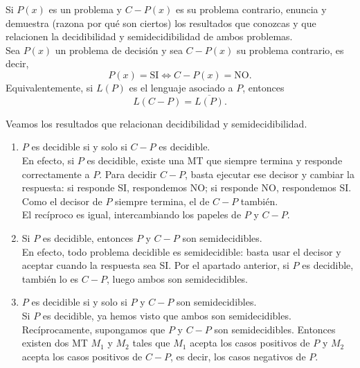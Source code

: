 \documentclass[12pt]{article}
\begin{document}
    \newpage

    \begin{ejercicio}[1.3 puntos]
        Si $P(x)$ es un problema y $C-P(x)$ es su problema contrario, enuncia y demuestra (razona por qué son ciertos) los resultados 
        que conozcas y que relacionen la decidibilidad y semidecidibilidad de ambos problemas. \\

        Sea $P(x)$ un problema de decisión y sea $C-P(x)$ su problema contrario, es decir,
        $$
        P(x)=\text{SI} \Longleftrightarrow C-P(x)=\text{NO}.
        $$
        Equivalentemente, si $L(P)$ es el lenguaje asociado a $P$, entonces
        $$
        L(C-P)=\overline{L(P)}.
        $$

        Veamos los resultados que relacionan decidibilidad y semidecidibilidad.

        \begin{enumerate}
            \item $P$ es decidible si y solo si $C-P$ es decidible. \\

            En efecto, si $P$ es decidible, existe una MT que siempre termina y responde correctamente a $P$. Para decidir 
            $C-P$, basta ejecutar ese decisor y cambiar la respuesta: si responde SI, respondemos NO; si responde NO, respondemos SI. 
            Como el decisor de $P$ siempre termina, el de $C-P$ también. \\

            El recíproco es igual, intercambiando los papeles de $P$ y $C-P$.

            \item Si $P$ es decidible, entonces $P$ y $C-P$ son semidecidibles. \\

            En efecto, todo problema decidible es semidecidible: basta usar el decisor y aceptar cuando la respuesta sea SI. Por el apartado anterior, si $P$ es decidible, también lo es $C-P$, luego ambos son semidecidibles.

            \item $P$ es decidible si y solo si $P$ y $C-P$ son semidecidibles. \\

            Si $P$ es decidible, ya hemos visto que ambos son semidecidibles. \\

            Recíprocamente, supongamos que $P$ y $C-P$ son semidecidibles. Entonces existen dos MT $M_1$ y $M_2$ tales que $M_1$ acepta los casos positivos de $P$ y $M_2$ acepta los casos positivos de $C-P$, es decir, los casos negativos de $P$.


\end{enumerate}
\end{ejercicio}
\end{document}
